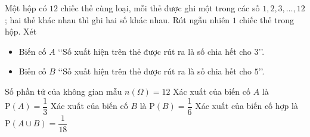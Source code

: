 \begin{ex}%
 Một hộp có $12$ chiếc thẻ cùng loại, mỗi thẻ được ghi một trong các số $1,2,3,  \ldots, 12$; hai thẻ khác nhau thì ghi hai số khác nhau. Rút ngẫu nhiên $1$ chiếc thẻ trong hộp. Xét
 \begin{itemize}
  \item Biến cố $A$ \lq\lq Số xuất  hiện trên thẻ được rút ra là số chia hết cho $3$\rq\rq.
  \item Biến cố $B$ \lq\lq Số xuất hiện trên thẻ được rút ra là  số chia hết cho $5$\rq\rq.
 \end{itemize}
 \choiceTF 
  {\True Số phần tử của  không gian mẫu $n(\Omega)=12$}
  {\True Xác xuất của  biến cố $A$ là $\mathrm{P}(A)=\dfrac{1}{3}$}
  {\True Xác xuất của biến  cố $B$ là $\mathrm{P}(B)=\dfrac{1}{6}$}
  {Xác xuất của biến cố hợp là $\mathrm{P}(A \cup  B)=\dfrac{1}{18}$}
\end{ex}


